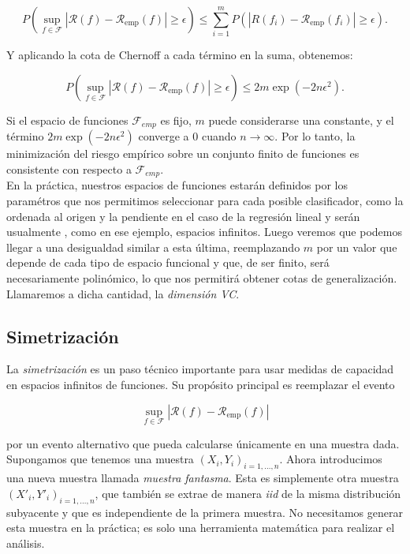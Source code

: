 \documentclass{article}
\begin{document}
\[
P\left(\sup_{f \in \mathcal{F}} |\mathcal{R}(f) - \mathcal{R}_{\text{emp}}(f)| \geq \epsilon \right) \leq \sum_{i=1}^m P\left(|R(f_i) - \mathcal{R}_{\text{emp}}(f_i)| \geq \epsilon \right).
\]

Y aplicando la cota de Chernoff a cada término en la suma, obtenemos:

\begin{equation}
P\left(\sup_{f \in \mathcal{F}} |\mathcal{R}(f) - \mathcal{R}_{\text{emp}}(f)| \geq \epsilon \right) \leq 2m \exp(-2n\epsilon^2). \label{eq: chernoff acotada por m}
\end{equation}

Si el espacio de funciones \(\mathcal{F}_{emp}\) es fijo, \(m\) puede considerarse una 
constante, y el término \(2m \exp(-2n\epsilon^2)\) converge a \(0\) cuando \(n \to \infty\). Por lo tanto,
la minimización del riesgo empírico sobre un conjunto finito de funciones es consistente con respecto 
a \(\mathcal{F}_{emp}\). \\

En la práctica, nuestros espacios de funciones estarán definidos por los paramétros que nos permitimos 
seleccionar para cada posible clasificador, como la ordenada al origen y la pendiente en el caso de la regresión lineal y serán usualmente
, como en ese ejemplo,
espacios infinitos. Luego veremos que podemos llegar a una desigualdad similar a esta última, reemplazando $m$ por un valor que depende
de cada tipo de espacio funcional y que, de ser finito, será necesariamente polinómico, lo que nos permitirá obtener cotas de generalización.
Llamaremos a dicha cantidad, la \textit{dimensión VC}.

\subsection{Simetrización}

La \textit{simetrización} es un paso técnico importante para usar medidas de capacidad en espacios infinitos de 
funciones. Su propósito principal es reemplazar el evento 

\[
\sup_{f \in \mathcal{F}} |\mathcal{R}(f) - \mathcal{R}_{\text{emp}}(f)|
\]

por un evento alternativo que pueda calcularse únicamente en una muestra dada. Supongamos que tenemos una muestra 
\((X_i, Y_i)_{i=1,\dots,n}\). Ahora introducimos una nueva muestra llamada \textit{muestra fantasma}. 
Esta es simplemente otra muestra \((X'_i, Y'_i)_{i=1,\dots,n}\), que también se extrae de manera 
\textit{iid} de la misma distribución subyacente y que es independiente de la primera muestra. No necesitamos generar 
esta muestra en la práctica; es solo una herramienta matemática para realizar el análisis. 
\end{document}

